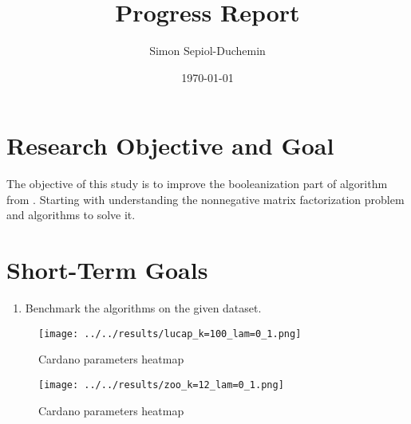 \documentclass[a4paper,11pt]{article}
\title{Progress Report}
\author{Simon Sepiol-Duchemin}
\date{\today}
\begin{document}
%
\maketitle
\thispagestyle{empty}
%
\section{Research Objective and Goal}
The objective of this study is to improve the booleanization part of algorithm from \cite{9521203}. Starting with understanding the nonnegative matrix factorization problem and algorithms to solve it.
\section{Short-Term Goals}
\begin{enumerate}
\item Benchmark the algorithms on the given dataset.
\end{enumerate}



\begin{figure}[H]
    \centering
    \texttt{[image: ../../results/lucap\_k=100\_lam=0\_1.png]}
    \caption{Cardano parameters heatmap}
\end{figure}
\begin{figure}[H]
    \centering
    \texttt{[image: ../../results/zoo\_k=12\_lam=0\_1.png]}
    \caption{Cardano parameters heatmap}
\end{figure}




\end{document}
